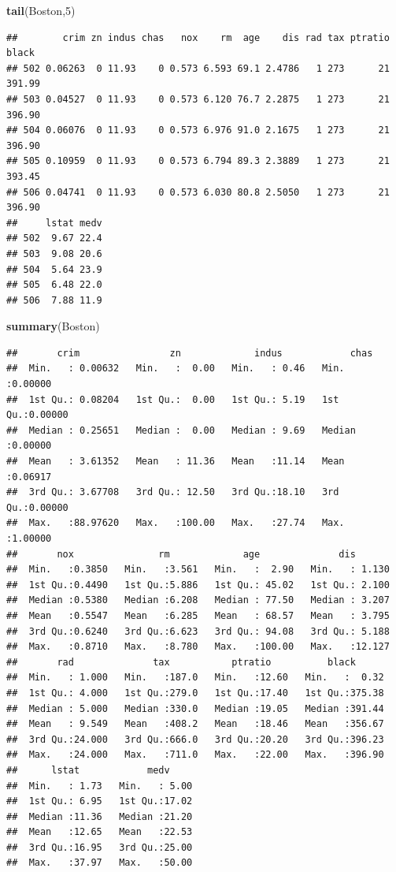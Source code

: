 \documentclass[]{book}
\newenvironment{Shaded}{\begin{snugshade}}{\end{snugshade}}
\newcommand{\DecValTok}[1]{\textcolor[rgb]{0.00,0.00,0.81}{#1}}
\newcommand{\KeywordTok}[1]{\textcolor[rgb]{0.13,0.29,0.53}{\textbf{#1}}}
\newcommand{\NormalTok}[1]{#1}
\begin{document}
\begin{Shaded}
\begin{Highlighting}[]
\KeywordTok{tail}\NormalTok{(Boston,}\DecValTok{5}\NormalTok{)}
\end{Highlighting}
\end{Shaded}

\begin{verbatim}
##        crim zn indus chas   nox    rm  age    dis rad tax ptratio  black
## 502 0.06263  0 11.93    0 0.573 6.593 69.1 2.4786   1 273      21 391.99
## 503 0.04527  0 11.93    0 0.573 6.120 76.7 2.2875   1 273      21 396.90
## 504 0.06076  0 11.93    0 0.573 6.976 91.0 2.1675   1 273      21 396.90
## 505 0.10959  0 11.93    0 0.573 6.794 89.3 2.3889   1 273      21 393.45
## 506 0.04741  0 11.93    0 0.573 6.030 80.8 2.5050   1 273      21 396.90
##     lstat medv
## 502  9.67 22.4
## 503  9.08 20.6
## 504  5.64 23.9
## 505  6.48 22.0
## 506  7.88 11.9
\end{verbatim}

\begin{Shaded}
\begin{Highlighting}[]
\KeywordTok{summary}\NormalTok{(Boston)}
\end{Highlighting}
\end{Shaded}

\begin{verbatim}
##       crim                zn             indus            chas        
##  Min.   : 0.00632   Min.   :  0.00   Min.   : 0.46   Min.   :0.00000  
##  1st Qu.: 0.08204   1st Qu.:  0.00   1st Qu.: 5.19   1st Qu.:0.00000  
##  Median : 0.25651   Median :  0.00   Median : 9.69   Median :0.00000  
##  Mean   : 3.61352   Mean   : 11.36   Mean   :11.14   Mean   :0.06917  
##  3rd Qu.: 3.67708   3rd Qu.: 12.50   3rd Qu.:18.10   3rd Qu.:0.00000  
##  Max.   :88.97620   Max.   :100.00   Max.   :27.74   Max.   :1.00000  
##       nox               rm             age              dis        
##  Min.   :0.3850   Min.   :3.561   Min.   :  2.90   Min.   : 1.130  
##  1st Qu.:0.4490   1st Qu.:5.886   1st Qu.: 45.02   1st Qu.: 2.100  
##  Median :0.5380   Median :6.208   Median : 77.50   Median : 3.207  
##  Mean   :0.5547   Mean   :6.285   Mean   : 68.57   Mean   : 3.795  
##  3rd Qu.:0.6240   3rd Qu.:6.623   3rd Qu.: 94.08   3rd Qu.: 5.188  
##  Max.   :0.8710   Max.   :8.780   Max.   :100.00   Max.   :12.127  
##       rad              tax           ptratio          black       
##  Min.   : 1.000   Min.   :187.0   Min.   :12.60   Min.   :  0.32  
##  1st Qu.: 4.000   1st Qu.:279.0   1st Qu.:17.40   1st Qu.:375.38  
##  Median : 5.000   Median :330.0   Median :19.05   Median :391.44  
##  Mean   : 9.549   Mean   :408.2   Mean   :18.46   Mean   :356.67  
##  3rd Qu.:24.000   3rd Qu.:666.0   3rd Qu.:20.20   3rd Qu.:396.23  
##  Max.   :24.000   Max.   :711.0   Max.   :22.00   Max.   :396.90  
##      lstat            medv      
##  Min.   : 1.73   Min.   : 5.00  
##  1st Qu.: 6.95   1st Qu.:17.02  
##  Median :11.36   Median :21.20  
##  Mean   :12.65   Mean   :22.53  
##  3rd Qu.:16.95   3rd Qu.:25.00  
##  Max.   :37.97   Max.   :50.00
\end{verbatim}
\end{document}
